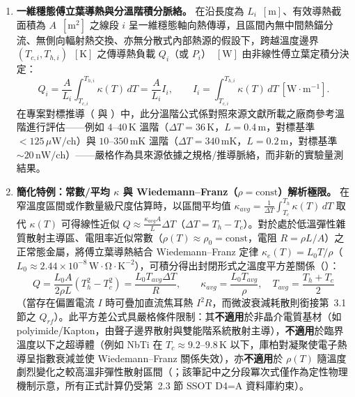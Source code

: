 \documentclass[11pt,a4paper]{article}
\begin{document}
\begin{enumerate}[leftmargin=*]
\item \textbf{一維穩態傅立葉導熱與分溫階積分脈絡。} 在沿長度為 $L_i$~$[\mathrm{m}]$、有效導熱截面積為 $A$~$[\mathrm{m}^2]$ 之線段 $i$ 呈一維穩態軸向熱傳導，且區間內無中間熱錨分流、無側向輻射熱交換、亦無分散式內部熱源的假設下，跨越溫度邊界 $(T_{c,i}, T_{h,i})$~$[\mathrm{K}]$ 之傳導熱負載 $Q_i$（或 $P_i$）~$[\mathrm{W}]$ 由非線性傅立葉定積分決定：
\begin{equation}
Q_i = \frac{A}{L_i}\int_{T_{c,i}}^{T_{h,i}}\kappa(T)\,dT = \frac{A}{L_i}I_i, \qquad I_i = \int_{T_{c,i}}^{T_{h,i}}\kappa(T)\,dT \ \left[\mathrm{W}\cdot\mathrm{m}^{-1}\right].
\end{equation}
在專案對標推導（ 與 ）中，此分溫階公式係對照來源文獻所載之廠商參考溫階進行評估——例如 $4\text{--}40\,\mathrm{K}$ 溫階（$\Delta T=36\,\mathrm{K}$，$L=0.4\,\mathrm{m}$，對標基準 $<125\,\mu\mathrm{W/ch}$）與 $10\text{--}350\,\mathrm{mK}$ 溫階（$\Delta T=340\,\mathrm{mK}$，$L=0.2\,\mathrm{m}$，對標基準 $\sim 20\,\mathrm{nW/ch}$）——嚴格作為具來源依據之規格/推導脈絡，而非新的實驗量測結果。

\item \textbf{簡化特例：常數/平均 $\kappa$ 與 Wiedemann--Franz（$\rho=\mathrm{const}$）解析極限。} 在窄溫度區間或作數量級尺度估算時，以區間平均值 $\kappa_{avg}=\frac{1}{\Delta T}\int_{T_c}^{T_h}\kappa(T)\,dT$ 取代 $\kappa(T)$ 可得線性近似 $Q \approx \frac{\kappa_{avg}A}{L}\Delta T$（$\Delta T = T_h - T_c$）。對於處於低溫彈性雜質散射主導區、電阻率近似常數（$\rho(T)\approx \rho_0=\mathrm{const}$，電阻 $R=\rho L/A$）之正常態金屬，將傅立葉導熱結合 Wiedemann--Franz 定律 $\kappa_e(T) = L_0 T/\rho$（$L_0 \approx 2.44\times 10^{-8}\,\mathrm{W\cdot\Omega\cdot K^{-2}}$），可積分得出封閉形式之溫度平方差關係（）：
\begin{equation}
Q = \frac{L_0 A}{2\rho L}\left(T_h^2 - T_c^2\right) = \frac{L_0 T_{avg}\Delta T}{R}, \qquad \kappa_{avg} = \frac{L_0 T_{avg}}{\rho}, \quad T_{avg}=\frac{T_h+T_c}{2}
\end{equation}
（當存在偏置電流 $I$ 時可疊加直流焦耳熱 $I^2 R$，而微波衰減耗散則銜接第~3.1 節之 $Q_{rf}$）。此平方差公式具嚴格條件限制：其\textbf{不適用}於非晶介電質基材（如 polyimide/Kapton，由聲子邊界散射與雙能階系統散射主導），\textbf{不適用}於臨界溫度以下之超導體（例如 NbTi 在 $T_c \approx 9.2\text{--}9.8\,\mathrm{K}$ 以下，庫柏對凝聚使電子熱導呈指數衰減並使 Wiedemann--Franz 關係失效），亦\textbf{不適用}於 $\rho(T)$ 隨溫度劇烈變化之較高溫非彈性散射區間（；該筆記中之分段冪次式僅作為定性物理機制示意，所有正式計算仍受第~2.3 節 SSOT D4=A 資料庫約束）。


\end{enumerate}
\end{document}
